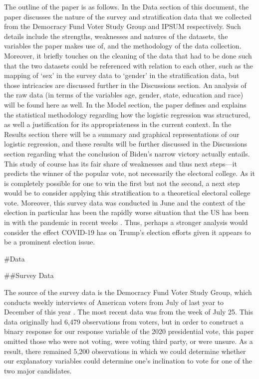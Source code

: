 \documentclass[
]{article}
\begin{document}
The outline of the paper is as follows. In the Data section of this document, the paper discusses the nature of the survey and stratification data that we collected from the Democracy Fund Voter Study Group and IPSUM respectively. Such details include the strengths, weaknesses and natures of the datasets, the variables the paper makes use of, and the methodology of the data collection. Moreover, it briefly touches on the cleaning of the data that had to be done such that the two datasets could be referenced with relation to each other, such as the mapping of `sex' in the survey data to `gender' in the stratification data, but those intricacies are discussed further in the Discussions section. An analysis of the raw data (in terms of the variables age, gender, state, education and race) will be found here as well. In the Model section, the paper defines and explains the statistical methodology regarding how the logistic regression was structured, as well a justification for its appropriateness in the current context. In the Results section there will be a summary and graphical representations of our logistic regression, and these results will be further discussed in the Discussions section regarding what the conclusion of Biden's narrow victory actually entails. This study of course has its fair share of weaknesses and thus next steps---it predicts the winner of the popular vote, not necessarily the electoral college. As it is completely possible for one to win the first but not the second, a next step would be to consider applying this stratification to a theoretical electoral college vote. Moreover, this survey data was conducted in June and the context of the election in particular has been the rapidly worse situation that the US has been in with the pandemic in recent weeks \citep{citeHipes}. Thus, perhaps a stronger analysis would consider the effect COVID-19 has on Trump's election efforts given it appears to be a prominent election issue.

\#Data

\#\#Survey Data

The source of the survey data is the Democracy Fund Voter Study Group, which conducts weekly interviews of American voters from July of last year to December of this year \citep{citeSurvey}. The most recent data was from the week of July 25. This data originally had 6,479 observations from voters, but in order to construct a binary response for our response variable of the 2020 presidential vote, this paper omitted those who were not voting, were voting third party, or were unsure. As a result, there remained 5,200 observations in which we could determine whether our explanatory variables could determine one's inclination to vote for one of the two major candidates.
\end{document}
